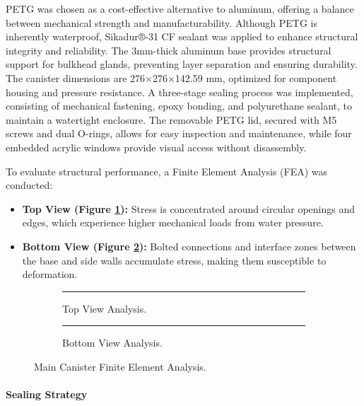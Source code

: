 \hspace{10pt} PETG was chosen as a cost-effective alternative to aluminum, offering a balance between mechanical strength and manufacturability. Although PETG is inherently waterproof, Sikadur®-31 CF sealant was applied to enhance structural integrity and reliability. The 3mm-thick aluminum base provides structural support for bulkhead glands, preventing layer separation and ensuring durability. The canister dimensions are 276×276×142.59 mm, optimized for component housing and pressure resistance. A three-stage sealing process was implemented, consisting of mechanical fastening, epoxy bonding, and polyurethane sealant, to maintain a watertight enclosure. The removable PETG lid, secured with M5 screws and dual O-rings, allows for easy inspection and maintenance, while four embedded acrylic windows provide visual access without disassembly.

\hspace{10pt} To evaluate structural performance, a Finite Element Analysis (FEA) was conducted:

\vspace{-0.5\baselineskip}
\begin{itemize}
    \setlength{\itemsep}{0pt}
    \item \textbf{Top View (Figure \ref{fig:top_fda}):} Stress is concentrated around circular openings and edges, which experience higher mechanical loads from water pressure.
    \item \textbf{Bottom View (Figure \ref{fig:bottom_fda}):} Bolted connections and interface zones between the base and side walls accumulate stress, making them susceptible to deformation.
\end{itemize}

\begin{figure}[h]
    \centering
    \begin{subfigure}[b]{0.45\columnwidth}
        \rule{\textwidth}{4cm}
        \caption{Top View Analysis.}
        \label{fig:top_fda}
    \end{subfigure}
    \hfill
    \begin{subfigure}[b]{0.45\columnwidth}
        \rule{\textwidth}{4cm}
        \caption{Bottom View Analysis.}
        \label{fig:bottom_fda}
    \end{subfigure}
    \caption{Main Canister Finite Element Analysis.}
    \label{fig:fda}
\end{figure}

\vspace{-0.3cm}
\paragraph{Sealing Strategy} \ \\
\vspace{-0.5cm}

